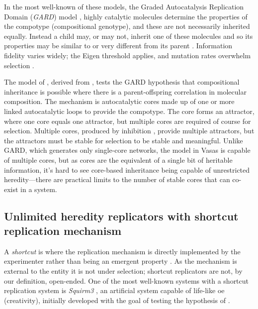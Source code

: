 
In the most well-known of these models, the Graded Autocatalysis Replication Domain (\emph{GARD}) model \parencite{Segre1998}, highly catalytic molecules determine the properties of the compotype (compositional genotype), and these are not necessarily inherited equally. Instead a child may, or may not, inherit one of these molecules and so its properties may be similar to or very different from its parent \parencite{Vasas2015, Vasas2012, Vasas2012a}. Information fidelity varies widely; the Eigen threshold \parencite{Eigen1971} applies, and mutation rates overwhelm selection \parencite{Vasas2015, Vasas2012, Vasas2012a}.


The model of \textcite{Vasas2015, Vasas2012, Vasas2012a}, derived from \textcite{Farmer1986}, tests the GARD hypothesis that compositional inheritance is possible where there is a parent-offspring correlation in molecular composition. The mechanism is autocatalytic cores made up of one or more linked autocatalytic loops to provide the compotype. The core forms an attractor, where one core equals one attractor, but multiple cores are required of course for selection. Multiple cores, produced by inhibition \cite{Vasas2012a}, provide multiple attractors, but the attractors must be stable for selection to be stable and meaningful. Unlike GARD, which generates only single-core networks, the model in Vasas is capable of multiple cores, but as cores are the equivalent of a single bit of heritable information, it's hard to see core-based inheritance being capable of unrestricted heredity---there are practical limits to the number of stable cores that can co-exist in a system. 

\subsection{Unlimited heredity replicators with shortcut replication mechanism}

A \emph{shortcut} is where the replication mechanism is directly implemented by the experimenter rather than being an emergent property \parencite{BanzhafBaumgaertnerBeslonEtAl2016}. As the mechanism is external to the entity it is not under selection; shortcut replicators are not, by our definition, open-ended. One of the most well-known systems with a shortcut replication system is \emph{Squirm3} \parencite{Hutton2007,Hutton2002}, an artificial system capable of life-like \gls{oe} (creativity), initially developed with the goal of testing the hypothesis of \textcite{Taylor2001} \parencite[p.341]{Hutton2002}.

